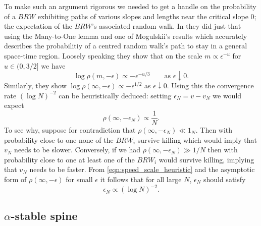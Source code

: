 To make such an argument rigorous we needed to get a handle on the probability of a $BRW$ exhibiting paths of various slopes and lengths near the critical slope $0$; the expectation of the $BRW$'s associated random walk. In \cite{gantert2008asymptotics} they did just that using the Many-to-One lemma and one of Mogulskii's results which accurately describes the probabilitiy of a centred random walk's path to stay in a general space-time region. Loosely speaking they show that on the scale $m \propto \epsilon^{-u}$ for $u \in (0, 3/2]$ we have
\begin{equation}
\log \rho(m, -\epsilon) \propto - \epsilon^{-u/3}\qquad\text{as } \epsilon \downarrow 0. 
\end{equation}
Similarly, they show $\log\rho(\infty, -\epsilon) \propto - \epsilon^{1/2}$ as $\epsilon \downarrow 0$. Using this the convergence rate $(\log N)^{-2}$ can be heuristically deduced: setting $\epsilon_N = v - v_N$ we would expect 
\begin{equation}\label{eqn:speed_scale_heuristic}
\rho(\infty, - \epsilon_N) \propto \frac{1}{N}. 
\end{equation}
To see why, suppose for contradiction that $\rho(\infty, - \epsilon_N) \ll 1_N$. Then with probability close to one none of the $BRW_i$ survive killing which would imply that $v_N$ needs to be slower. Conversely, if we had $\rho(\infty, - \epsilon_N) \gg 1/N$ then with probability close to one at least one of the $BRW_i$ would survive killing, implying that $v_N$ needs to be faster. From \ref{eqn:speed_scale_heuristic} and the asymptotic form of $\rho(\infty, -\epsilon)$ for small $\epsilon$ it follows that for all large $N$, $\epsilon_N$ should satisfy
\begin{equation}
\epsilon_N \propto (\log N)^{-2}. 
\end{equation}

\subsection{$\alpha$-stable spine}

